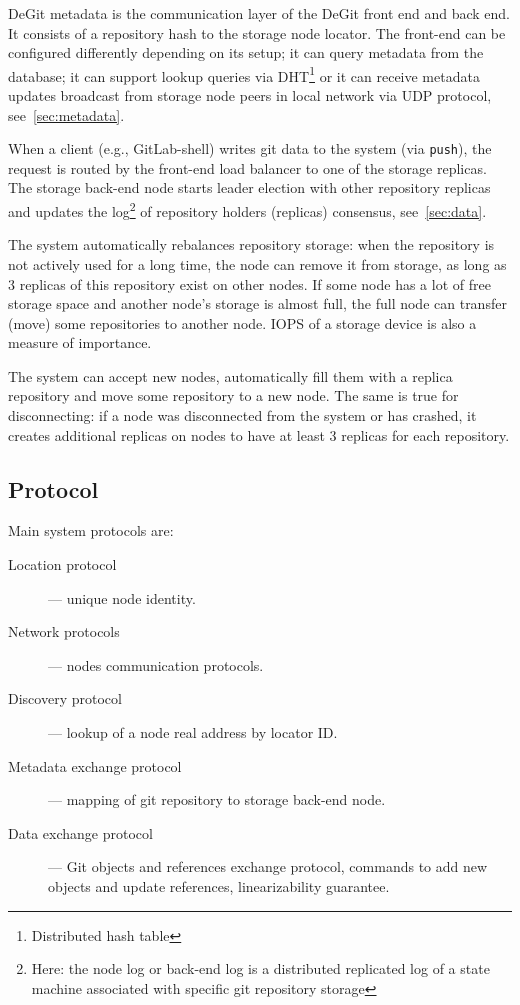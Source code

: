 \documentclass[acmlarge, screen, nonacm, 11pt]{acmart}
\newcommand{\code}[1]{\texttt{#1}}
\begin{document}
DeGit metadata is the communication layer of the DeGit front end and back end. It consists of a repository hash to the storage node locator.
The front-end can be configured differently depending on
its setup; it can query metadata from the database; it can support lookup queries via DHT\footnote{Distributed hash table}
or it can receive metadata updates broadcast from storage node peers in local network via UDP protocol,
see~\ref{sec:metadata}.

When a client (e.g., GitLab-shell) writes git data to the system (via \code{push}), the request is routed
by the front-end load balancer to one of the storage replicas.
The storage back-end node starts leader election with other repository replicas and updates the log\footnote{Here: the node log
or back-end log is a distributed replicated log of a state machine associated with specific git repository storage}
of repository holders (replicas) consensus, see~\ref{sec:data}.

The system automatically rebalances repository storage: when the repository is not actively used for a
long time, the node can remove it from storage, as long as 3 replicas of this repository exist on other nodes.
If some node has a lot of free storage space and another node's storage is almost full,
the full node can transfer (move) some repositories to another node. IOPS of a storage device is also
a measure of importance.

The system can accept new nodes, automatically fill them with a replica repository and
move some repository to a new node. The same is true for disconnecting: if a node was disconnected from the system or has crashed,
it creates additional replicas on nodes to have at least 3 replicas for each repository.

\subsection{Protocol}
Main system protocols are:
\begin{description}
  \item[Location protocol] --- unique node identity.
  \item[Network protocols] --- nodes communication protocols.
  \item[Discovery protocol] --- lookup of a node real address by locator ID.
  \item[Metadata exchange protocol] --- mapping of git repository to storage back-end node.
  \item[Data exchange protocol] --- Git objects and references exchange protocol,
    commands to add new objects and update references, linearizability guarantee.
\end{description}
\end{document}
